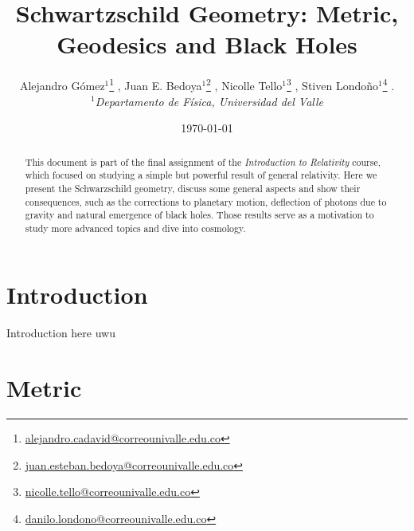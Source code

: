 \documentclass[letterpaper,11pt,onecolumn]{article}
\title{Schwartzschild Geometry: Metric, Geodesics and Black Holes}
\author{ Alejandro Gómez$^1$\thanks{\href{mailto:alejandro.cadavid@correounivalle.edu.co}{alejandro.cadavid@correounivalle.edu.co}} , Juan E. Bedoya$^1$\thanks{\href{mailto:juan.esteban.bedoya@correounivalle.edu.co}{juan.esteban.bedoya@correounivalle.edu.co}} , Nicolle Tello$^1$\thanks{\href{mailto:nicolle.tello@correounivalle.edu.co}{nicolle.tello@correounivalle.edu.co}} , Stiven Londoño$^1$\thanks{\href{mailto:danilo.londono@correounivalle.edu.co}{danilo.londono@correounivalle.edu.co}} . \\ $^1$\textit{Departamento de Física, Universidad del Valle} }
\date{\today}
\begin{document}
\maketitle

\begin{abstract}
    This document is part of the final assignment of the \textit{Introduction to Relativity} course, which focused on studying a simple but powerful result of general relativity. Here we present the Schwarzschild geometry, discuss some general aspects and show their consequences, such as the corrections to planetary motion, deflection of photons due to gravity and natural emergence of black holes. Those results serve as a motivation to study more advanced topics and dive into cosmology.  
    
\end{abstract}

\tableofcontents

\newpage


\section{Introduction}\label{intro} \cite{1916SPAW.......189S}


Introduction here uwu
\cite{hobson_efstathiou_lasenby_2006}

\section{Metric}\label{metric}
\end{document}
